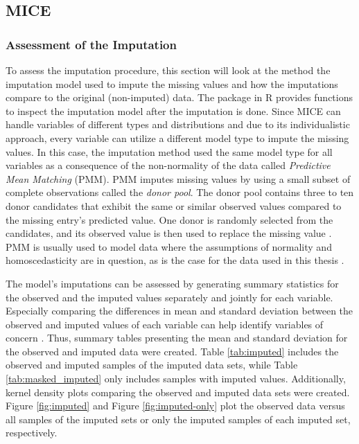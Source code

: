 \subsection{MICE}
\subsubsection{Assessment of the Imputation}
To assess the imputation procedure, this section will look at the 
method the imputation model used to impute the missing values and how the 
imputations compare to the original (non-imputed) data. The  
package in R provides functions to inspect the imputation model after the 
imputation is done. Since MICE can handle variables of different types and 
distributions and due to its individualistic approach, every variable can 
utilize a different model type to impute the missing values. In this case, the 
imputation method used the same model type for all variables as a consequence 
of the non-normality of the data called \textit{Predictive Mean Matching} (PMM).
PMM imputes missing values by using a small subset of complete observations 
called the \textit{donor pool}. The donor pool contains three to ten donor 
candidates 
that exhibit the same or similar observed values compared to the missing 
entry's predicted value. One donor is randomly selected from the candidates, 
and its observed value is then used to replace the missing value 
\cite{RN144, RN145, RN146}. PMM is usually used to model data where the 
assumptions of normality and homoscedasticity are in question, as is the case 
for the data used in this thesis \cite{RN146}.
\par
The model's imputations can be assessed by generating summary statistics for the
observed and the imputed values separately and jointly for each variable. 
Especially comparing the differences in mean and standard deviation between the 
observed and imputed values of each variable can help identify variables of 
concern \cite{RN141}. Thus, summary tables presenting the mean and standard 
deviation for the observed and imputed data were created. Table 
\ref{tab:imputed} includes the observed and imputed samples of the imputed 
data sets, while Table \ref{tab:masked_imputed} only includes samples with 
imputed values. Additionally, kernel density plots comparing the observed and 
imputed data sets were created. Figure \ref{fig:imputed} and Figure 
\ref{fig:imputed-only} plot the observed data versus all samples of the imputed 
sets or only the imputed samples of each imputed set, respectively.
\\
